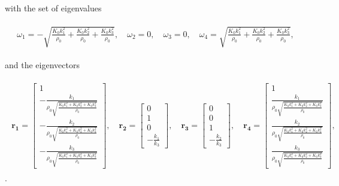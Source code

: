 with the set of eigenvalues

\begin{align}
    \begin{split}
        \omega_1 = -\sqrt{\frac{K_{0} k_{1}^{2}}{\rho_{0}} + \frac{K_{0} k_{2}^{2}}{\rho_{0}} + \frac{K_{0} k_{3}^{2}}{\rho_{0}}}, \quad
        \omega_2 = 0, \quad
        \omega_3 = 0, \quad 
        \omega_4 = \sqrt{\frac{K_{0} k_{1}^{2}}{\rho_{0}} + \frac{K_{0} k_{2}^{2}}{\rho_{0}} + \frac{K_{0} k_{3}^{2}}{\rho_{0}}}, 
    \end{split}
\end{align}

and the eigenvectors

\begin{align}
    \begin{split}
    \mathbf{r_1} = \begin{bmatrix}
        1 \\
-\frac{k_{1}}{\rho_{0} \sqrt{\frac{K_{0} k_{1}^{2} + K_{0} k_{2}^{2} + K_{0} k_{3}^{2}}{\rho_{0}}}} \\
-\frac{k_{2}}{\rho_{0} \sqrt{\frac{K_{0} k_{1}^{2} + K_{0} k_{2}^{2} + K_{0} k_{3}^{2}}{\rho_{0}}}} \\
-\frac{k_{3}}{\rho_{0} \sqrt{\frac{K_{0} k_{1}^{2} + K_{0} k_{2}^{2} + K_{0} k_{3}^{2}}{\rho_{0}}}}
        \end{bmatrix}, \quad
        \mathbf{r_2} = \begin{bmatrix}
            0 \\
1 \\
0 \\
-\frac{k_{1}}{k_{3}}
            \end{bmatrix}, \quad
            \mathbf{r_3} = \begin{bmatrix}
                0 \\
                0 \\
                1 \\
                -\frac{k_{2}}{k_{3}}
                \end{bmatrix}, \quad
                \mathbf{r_4} = \begin{bmatrix}
                    1 \\
\frac{k_{1}}{\rho_{0} \sqrt{\frac{K_{0} k_{1}^{2} + K_{0} k_{2}^{2} + K_{0} k_{3}^{2}}{\rho_{0}}}} \\
\frac{k_{2}}{\rho_{0} \sqrt{\frac{K_{0} k_{1}^{2} + K_{0} k_{2}^{2} + K_{0} k_{3}^{2}}{\rho_{0}}}} \\
\frac{k_{3}}{\rho_{0} \sqrt{\frac{K_{0} k_{1}^{2} + K_{0} k_{2}^{2} + K_{0} k_{3}^{2}}{\rho_{0}}}}
                    \end{bmatrix},
    \end{split}
\end{align} .

